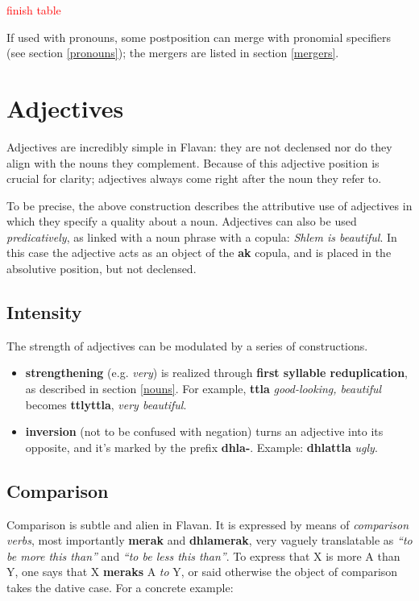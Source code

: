 \documentclass[10pt,oneside]{memoir}
\newcommand{\cmmnt}[1]{\textcolor{red}{#1}}
\begin{document}
\cmmnt{finish table}

If used with pronouns, some postposition can merge with pronomial specifiers (see section \ref{pronouns}); the mergers are listed in section \ref{mergers}.


\section{Adjectives}

Adjectives are incredibly simple in Flavan: they are not declensed nor do they align with the nouns they complement. Because of this adjective position is crucial for clarity; adjectives always come right after the noun they refer to.

To be precise, the above construction describes the attributive use of adjectives in which they specify a quality about a noun. Adjectives can also be used \emph{predicatively}, as linked with a noun phrase with a copula: \emph{Shlem is beautiful}. In this case the adjective acts as an object of the \textbf{ak} copula, and is placed in the absolutive position, but not declensed. %


\subsection{Intensity}

The strength of adjectives can be modulated by a series of constructions.

\begin{itemize}
    \item \textbf{strengthening} (e.g. \emph{very}) is realized through \textbf{first syllable reduplication}, as described in section \ref{nouns}. For example, \textbf{ttla} \emph{good-looking, beautiful} becomes \textbf{ttlyttla}, \emph{very beautiful}.
	\item \textbf{inversion} (not to be confused with negation) turns an adjective into its opposite, and it's marked by the prefix \textbf{dhla-}. Example: \textbf{dhlattla} \emph{ugly}.
\end{itemize}

\subsection{Comparison}

Comparison is subtle and alien in Flavan. It is expressed by means of \emph{comparison verbs}, most importantly \textbf{merak} and \textbf{dhlamerak}, very vaguely translatable as \emph{``to be more this than''} and \emph{``to be less this than''}. To express that X is more A than Y, one says that X \textbf{meraks} A \emph{to} Y, or said otherwise the object of comparison takes the dative case. For a concrete example:
\end{document}
